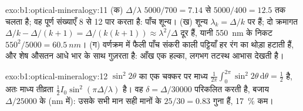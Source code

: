 \begin{solution}{exo:b1:optical-mineralogy:11}
(क) $\Delta/\lambda$ $5000/700 = 7.14$ से $5000/400 = 12.5$ तक चलता है; वह पूर्ण संख्याएँ 8 से 12 पार करता है: पाँच शून्य।
(ख) शून्य $\lambda_k = \Delta/k$ पर हैं; दो क्रमागत $\Delta/k - \Delta/(k + 1) =
\Delta/(k(k + 1)) \approx \lambda^2/\Delta$ दूर हैं, यानी \qty{550}{nm} के निकट $550^2/5000 =
\qty{60.5}{nm}$। (ग) वर्णक्रम में फैली पाँच संकरी काली पट्टियाँ हर रंग का थोड़ा हटाती हैं, और शेष औसतन आधे भार के साथ
गुज़रता है: आँख एक हल्का, लगभग तटस्थ आभास देखती है।
\end{solution}

\begin{solution}{exo:b1:optical-mineralogy:12}
$\sin^2 2\theta$ का एक चक्कर पर माध्य $\frac1{2\pi}\int_0^{2\pi}\sin^2 2\theta\,
\mathrm d\theta = \frac12$ है, अतः माध्य तीव्रता
$\frac12 I_0\sin^2(\pi\Delta/\lambda)$ है। वह $\delta = \Delta/30000$ परिकलित करती है, बजाय $\Delta/25000$ के (nm में): उसके सभी
मान सही मानों के $25/30 = 0.83$ गुना हैं, \qty{17}{\percent} कम।
\end{solution}

